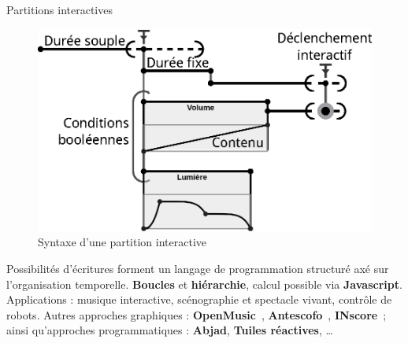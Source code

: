 \begin{block}{Partitions interactives}
\begin{figure}
\includegraphics[width=\columnwidth]{images/score.eps}
\caption{Syntaxe d'une partition interactive}
\end{figure}
Possibilités d'écritures forment un langage de programmation structuré axé sur l'organisation temporelle. 
\textbf{Boucles} et \textbf{hiérarchie}, calcul possible via \textbf{Javascript}.
Applications : musique interactive, scénographie et spectacle vivant, contrôle de robots.
Autres approches graphiques : \textbf{OpenMusic}~\cite{bresson_openmusic:_2011}, \textbf{Antescofo}~\cite{cont2008antescofo}, \textbf{INscore}~\cite{fober2012environment}; ainsi qu'approches programmatiques : \textbf{Abjad}, \textbf{Tuiles réactives}, \dots
\end{block}